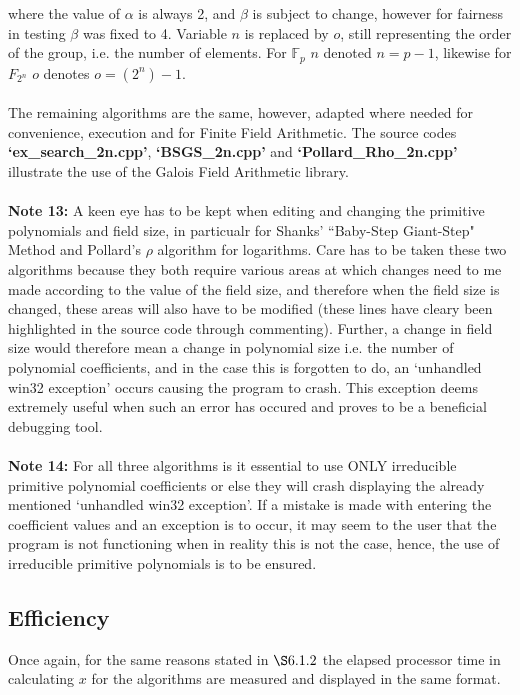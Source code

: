 \documentclass[iwp,first]{luthesis}
\begin{document}
where the value of $\alpha$ is always 2, and $\beta$ is subject to change, however for fairness in testing $\beta$ was fixed to 4. Variable $n$ is replaced by $o$, still representing the order of the group, i.e. the number of elements. For $\mathbb{F}_{p}$ $n$ denoted $n = p-1$, likewise for $F_{2^n}$ $o$ denotes $o = (2^n)-1$.
\\
\\
The remaining algorithms are the same, however, adapted where needed for convenience, execution and for Finite Field Arithmetic. The source codes 
\\
\textbf{`ex\_search\_2n.cpp'}, \textbf{`BSGS\_2n.cpp'} and \textbf{`Pollard\_Rho\_2n.cpp'} illustrate the use of the Galois Field Arithmetic library.
\\
\\
\textbf{Note 13:} A keen eye has to be kept when editing and changing the primitive polynomials and field size, in particualr for Shanks' ``Baby-Step Giant-Step" Method and Pollard's $\rho$ algorithm for logarithms. Care has to be taken these two algorithms because they both require various areas at which changes need to me made according to the value of the field size, and therefore when the field size is changed, these areas will also have to be modified (these lines have cleary been highlighted in the source code through commenting). Further, a change in field size would therefore mean a change in polynomial size i.e. the number of polynomial coefficients, and in the case this is forgotten to do, an `unhandled win32 exception' occurs causing the program to crash. This exception deems extremely useful when such an error has occured and proves to be a beneficial debugging tool.
\\
\\
\textbf{Note 14:} For all three algorithms is it essential to use ONLY irreducible primitive polynomial coefficients or else they will crash displaying the already mentioned `unhandled win32 exception'. If a mistake is made with entering the coefficient values and an exception is to occur, it may seem to the user that the program is not functioning when in reality this is not the case, hence, the use of irreducible primitive polynomials is to be ensured.

\subsection{Efficiency}

Once again, for the same reasons stated in $\S6.1.2$ the elapsed processor time in calculating $x$ for the algorithms are measured and displayed in the same format. 
\end{document}
